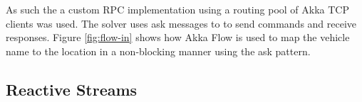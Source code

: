 \documentclass{article}
\begin{document}
As such the a custom RPC implementation using a routing pool of Akka TCP clients was used. The solver uses ask messages to to send commands and receive responses. Figure \ref{fig:flow-in} shows how Akka Flow is used to map the vehicle name to the location in a non-blocking manner using the ask pattern.






\subsection{Reactive Streams}
\end{document}

